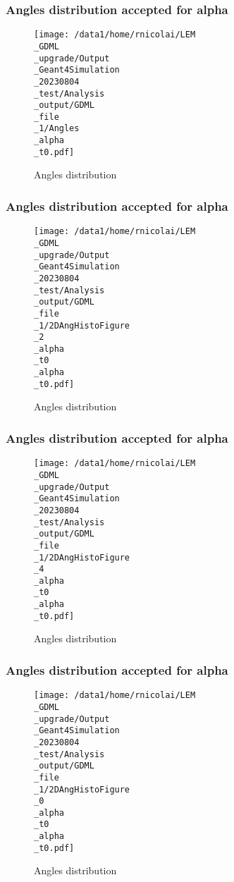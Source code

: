 \documentclass[8pt]{beamer}
\begin{document}
            \begin{frame}
                \frametitle{Angles distribution accepted for alpha}
            
        \begin{figure}[h]
            \centering
            \texttt{[image: /data1/home/rnicolai/LEM\\\_GDML\\\_upgrade/Output\\\_Geant4Simulation\\\_20230804\\\_test/Analysis\\\_output/GDML\\\_file\\\_1/Angles\\\_alpha\\\_t0.pdf]}
            \caption{Angles distribution}
        \end{figure}
        
            \end{frame}
            
            \begin{frame}
                \frametitle{Angles distribution accepted for alpha}
            
        \begin{figure}[h]
            \centering
            \texttt{[image: /data1/home/rnicolai/LEM\\\_GDML\\\_upgrade/Output\\\_Geant4Simulation\\\_20230804\\\_test/Analysis\\\_output/GDML\\\_file\\\_1/2DAngHistoFigure\\\_2\\\_alpha\\\_t0\\\_alpha\\\_t0.pdf]}
            \caption{Angles distribution}
        \end{figure}
        
            \end{frame}
            
            \begin{frame}
                \frametitle{Angles distribution accepted for alpha}
            
        \begin{figure}[h]
            \centering
            \texttt{[image: /data1/home/rnicolai/LEM\\\_GDML\\\_upgrade/Output\\\_Geant4Simulation\\\_20230804\\\_test/Analysis\\\_output/GDML\\\_file\\\_1/2DAngHistoFigure\\\_4\\\_alpha\\\_t0\\\_alpha\\\_t0.pdf]}
            \caption{Angles distribution}
        \end{figure}
        
            \end{frame}
            
            \begin{frame}
                \frametitle{Angles distribution accepted for alpha}
            
        \begin{figure}[h]
            \centering
            \texttt{[image: /data1/home/rnicolai/LEM\\\_GDML\\\_upgrade/Output\\\_Geant4Simulation\\\_20230804\\\_test/Analysis\\\_output/GDML\\\_file\\\_1/2DAngHistoFigure\\\_0\\\_alpha\\\_t0\\\_alpha\\\_t0.pdf]}
            \caption{Angles distribution}
        \end{figure}
        
            \end{frame}
            
\end{document}
